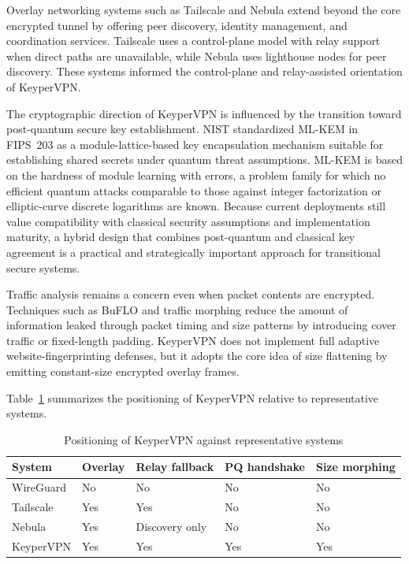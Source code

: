 \documentclass[conference]{IEEEtran}
\begin{document}
Overlay networking systems such as Tailscale and Nebula extend beyond the core encrypted tunnel by offering peer discovery, identity management, and coordination services. Tailscale uses a control-plane model with relay support when direct paths are unavailable, while Nebula uses lighthouse nodes for peer discovery. These systems informed the control-plane and relay-assisted orientation of KeyperVPN.

The cryptographic direction of KeyperVPN is influenced by the transition toward post-quantum secure key establishment. NIST standardized ML-KEM in FIPS~203 as a module-lattice-based key encapsulation mechanism suitable for establishing shared secrets under quantum threat assumptions. ML-KEM is based on the hardness of module learning with errors, a problem family for which no efficient quantum attacks comparable to those against integer factorization or elliptic-curve discrete logarithms are known. Because current deployments still value compatibility with classical security assumptions and implementation maturity, a hybrid design that combines post-quantum and classical key agreement is a practical and strategically important approach for transitional secure systems.

Traffic analysis remains a concern even when packet contents are encrypted. Techniques such as BuFLO and traffic morphing reduce the amount of information leaked through packet timing and size patterns by introducing cover traffic or fixed-length padding. KeyperVPN does not implement full adaptive website-fingerprinting defenses, but it adopts the core idea of size flattening by emitting constant-size encrypted overlay frames.

Table~\ref{tab:related} summarizes the positioning of KeyperVPN relative to representative systems.

\begin{table}[t]
\caption{Positioning of KeyperVPN against representative systems}
\label{tab:related}
\centering
\begin{tabular}{p{1.6cm}p{1.2cm}p{1.1cm}p{1.2cm}p{1.4cm}}
\toprule
System & Overlay & Relay fallback & PQ handshake & Size morphing \\
\midrule
WireGuard & No & No & No & No \\
Tailscale & Yes & Yes & No & No \\
Nebula & Yes & Discovery only & No & No \\
KeyperVPN & Yes & Yes & Yes & Yes \\
\bottomrule
\end{tabular}
\end{table}
\end{document}
